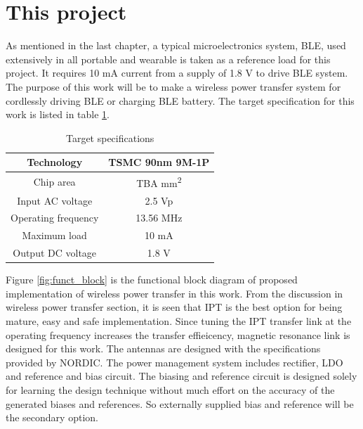 \documentclass[UKenglish]{ifimaster}  %
\begin{document}
\section{This project}
As mentioned in the last chapter, a typical microelectronics system, BLE, used extensively in all portable and 
wearable is taken as a reference load for this project. It requires 10 mA current from a supply of 1.8 V to drive 
BLE system. The purpose of this work will be to make a wireless power transfer system for cordlessly driving BLE 
or charging BLE battery. The target specification for this work is listed in table \ref{tab:proj_spec_tar}. \\

\begin{table}[!htbp]
\caption{Target specifications}
\begin{center}
\begin{tabular}{c|c}
\hline \hline
Technology 		& TSMC 90nm 9M-1P\\ \hline
Chip area 		& TBA mm\textsuperscript{2} \\ \hline
Input AC voltage	& 2.5 Vp \\ \hline
Operating frequency  	& 13.56 MHz \\ \hline
Maximum load 		& 10 mA \\ \hline
Output DC voltage 	& 1.8 V \\ 
\hline \hline
\end{tabular}
\end{center}
\label{tab:proj_spec_tar}
\end{table}

Figure \ref{fig:funct_block} is the functional block diagram of proposed implementation of wireless power transfer in 
this work. From the discussion in wireless power transfer section, it is seen that IPT is the best option for 
being mature, easy and safe implementation. Since tuning the IPT transfer link at the operating frequency 
increases the transfer effieicency, magnetic resonance link is designed for this work. The antennas are designed 
with the specifications provided by NORDIC. The power management system includes rectifier, LDO and reference and bias circuit. The biasing and reference circuit is designed solely for 
learning the design technique without much effort on the accuracy of the generated biases and references. So 
externally supplied bias and reference will be the secondary option. \\
\end{document}
